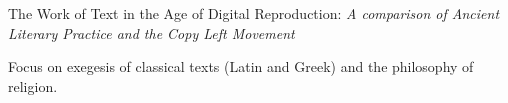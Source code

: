 \documentclass[]{deedy-resume-openfont}
\begin{document}
\vspace{\topsep} %
The Work of Text in the Age of Digital Reproduction:
\textit{A comparison of Ancient Literary Practice and the Copy Left Movement}
\sectionsep %

\vspace{\topsep} %
Focus on exegesis of classical texts (Latin and Greek) and the philosophy of religion.
\sectionsep
\end{document}
